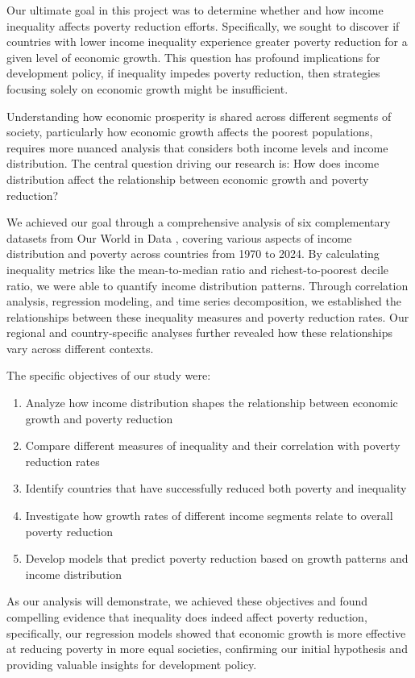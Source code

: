 \documentclass[12pt,a4paper]{article}
\begin{document}
Our ultimate goal in this project was to determine whether and how income inequality affects poverty reduction efforts. Specifically, we sought to discover if countries with lower income inequality experience greater poverty reduction for a given level of economic growth. This question has profound implications for development policy, if inequality impedes poverty reduction, then strategies focusing solely on economic growth might be insufficient.

Understanding how economic prosperity is shared across different segments of society, particularly how economic growth affects the poorest populations, requires more nuanced analysis that considers both income levels and income distribution. The central question driving our research is: How does income distribution affect the relationship between economic growth and poverty reduction?

We achieved our goal through a comprehensive analysis of six complementary datasets from Our World in Data \cite{hasell2022poverty}, covering various aspects of income distribution and poverty across countries from 1970 to 2024. By calculating inequality metrics like the mean-to-median ratio and richest-to-poorest decile ratio, we were able to quantify income distribution patterns. Through correlation analysis, regression modeling, and time series decomposition, we established the relationships between these inequality measures and poverty reduction rates. Our regional and country-specific analyses further revealed how these relationships vary across different contexts.

The specific objectives of our study were:
\begin{enumerate}
    \item Analyze how income distribution shapes the relationship between economic growth and poverty reduction
    \item Compare different measures of inequality and their correlation with poverty reduction rates
    \item Identify countries that have successfully reduced both poverty and inequality
    \item Investigate how growth rates of different income segments relate to overall poverty reduction
    \item Develop models that predict poverty reduction based on growth patterns and income distribution
\end{enumerate}

As our analysis will demonstrate, we achieved these objectives and found compelling evidence that inequality does indeed affect poverty reduction, specifically, our regression models showed that economic growth is more effective at reducing poverty in more equal societies, confirming our initial hypothesis and providing valuable insights for development policy.
\end{document}
